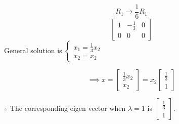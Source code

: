 \documentclass[12pt, a4paper]{article}
\begin{document}
\begin{center}
    \[
        R_1 \rightarrow \frac{1}{6}R_1
    \]
    \[
        \begin{bmatrix}
            1 & -\frac{1}{3} & 0 \\
            0 & 0 & 0
        \end{bmatrix}
    \]
\linebreak
    General solution is $\begin{cases}
        x_1 = \frac{1}{3}x_2 \\
        x_2 = x_2
    \end{cases}$

    \[
        \implies x = \begin{bmatrix}
            \frac{1}{3}x_2 \\
            x_2
        \end{bmatrix} = x_2 \begin{bmatrix}
            \frac{1}{3} \\
            1
        \end{bmatrix}
    \]

    $\therefore$ The corresponding eigen vector when $\lambda = 1$ is $\begin{bmatrix}
        \frac{1}{3} \\
        1
    \end{bmatrix}$.

\end{center}
\end{document}
